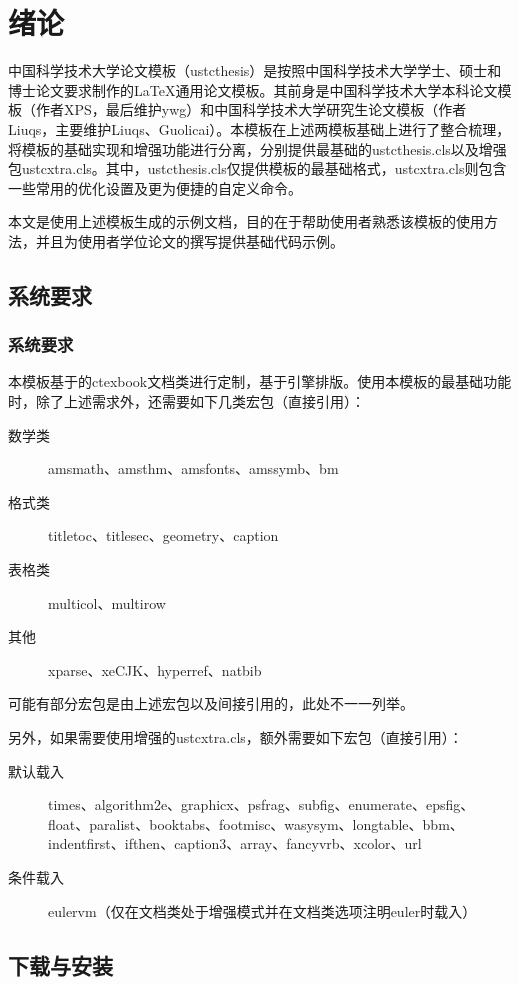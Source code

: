 ﻿
\chapter{绪论}
\label{chap:introduction}

中国科学技术大学论文模板（ustcthesis）是按照中国科学技术大学学士、硕士和博士论文要求制作的\LaTeX 通用论文模板。其前身是中国科学技术大学本科论文模板（作者XPS，最后维护ywg）和中国科学技术大学研究生论文模板（作者Liuqs，主要维护Liuqs、Guolicai）。本模板在上述两模板基础上进行了整合梳理，将模板的基础实现和增强功能进行分离，分别提供最基础的ustcthesis.cls以及增强包ustcxtra.cls。其中，ustcthesis.cls仅提供模板的最基础格式，ustcxtra.cls则包含一些常用的优化设置及更为便捷的自定义命令。

本文是使用上述模板生成的示例文档，目的在于帮助使用者熟悉该模板的使用方法，并且为使用者学位论文的撰写提供基础代码示例。

\section{系统要求}
\subsection{系统要求}
本模板基于\CTeX 的ctexbook文档类进行定制，基于\XeTeX 引擎排版。使用本模板的最基础功能时，除了上述需求外，还需要如下几类宏包（直接引用）：
\begin{description}
\item[数学类]{amsmath、amsthm、amsfonts、amssymb、bm}
\item[格式类]{titletoc、titlesec、geometry、caption}
\item[表格类]{multicol、multirow}
\item[其他]{xparse、xeCJK、hyperref、natbib}
\end{description}
可能有部分宏包是由上述宏包以及\CTeX 间接引用的，此处不一一列举。

另外，如果需要使用增强的ustcxtra.cls，额外需要如下宏包（直接引用）：
\begin{description}
\item[默认载入]{times、algorithm2e、graphicx、psfrag、subfig、enumerate、epsfig、float、paralist、booktabs、footmisc、wasysym、longtable、bbm、indentfirst、ifthen、caption3、array、fancyvrb、xcolor、url}
\item[条件载入]{eulervm（仅在文档类处于增强模式并在文档类选项注明euler时载入）}
\end{description}

\section{下载与安装}
